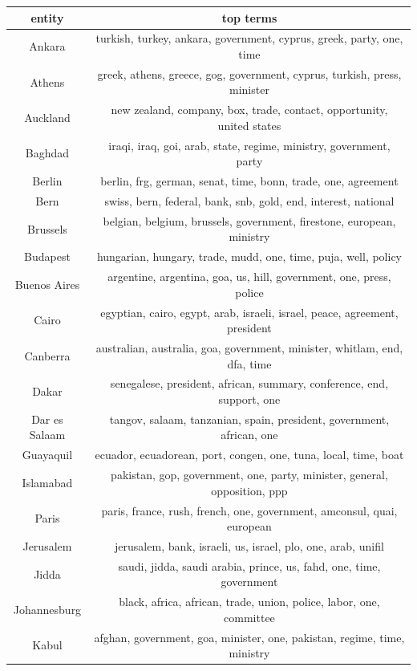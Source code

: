 \begin{table}
\centering
\small
\begin{tabular}{cc}
\toprule
\textbf{entity} & \textbf{top terms} \\
\midrule
Ankara & turkish, turkey, ankara, government, cyprus, greek, party, one, time \\
Athens & greek, athens, greece, gog, government, cyprus, turkish, press, minister \\
Auckland & new zealand, company, box, trade, contact, opportunity, united states \\
Baghdad & iraqi, iraq, goi, arab, state, regime, ministry, government, party \\
Berlin & berlin, frg, german, senat, time, bonn, trade, one, agreement \\
Bern & swiss, bern, federal, bank, snb, gold, end, interest, national \\
Brussels & belgian, belgium, brussels, government, firestone, european, ministry \\
Budapest & hungarian, hungary, trade, mudd, one, time, puja, well, policy \\
Buenos Aires & argentine, argentina, goa, us, hill, government, one, press, police \\
Cairo & egyptian, cairo, egypt, arab, israeli, israel, peace, agreement, president \\
Canberra & australian, australia, goa, government, minister, whitlam, end, dfa, time \\
Dakar & senegalese, president, african, summary, conference, end, support, one \\
Dar es Salaam & tangov, salaam, tanzanian, spain, president, government, african, one \\
Guayaquil & ecuador, ecuadorean, port, congen, one, tuna, local, time, boat \\
Islamabad & pakistan, gop, government, one, party, minister, general, opposition, ppp \\
Paris & paris, france, rush, french, one, government, amconsul, quai, european \\
Jerusalem & jerusalem, bank, israeli, us, israel, plo, one, arab, unifil \\
Jidda & saudi, jidda, saudi arabia, prince, us, fahd, one, time, government \\
Johannesburg & black, africa, african, trade, union, police, labor, one, committee \\
Kabul & afghan, government, goa, minister, one, pakistan, regime, time, ministry \\

\end{tabular}
\end{table}

